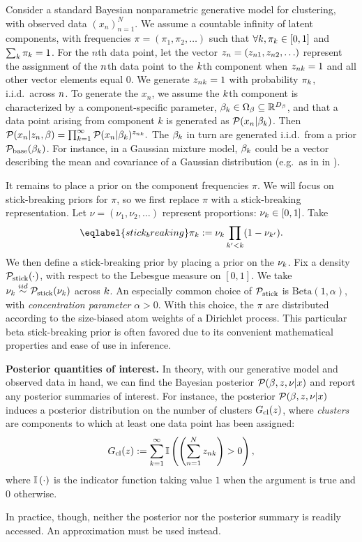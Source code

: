 Consider a standard Bayesian nonparametric generative model for clustering, with observed data $(x_n)_{n=1}^{N}$.
We assume a countable infinity of latent components, with frequencies $\pi = (\pi_1, \pi_2, \ldots)$ such that $\forall k, \pi_k \in [0,1]$ and $\sum_{k} \pi_k = 1$. For the $n$th data point, let the vector $z_n = (z_{n1}, z_{n2}, \ldots)$ represent the assignment of the $n$th data point to the $k$th component when $z_{nk} = 1$ and all other vector elements equal 0. We generate $z_{nk} = 1$ with probability $\pi_k$, i.i.d.\ across $n$. To generate the $x_n$, we assume the $k$th component is characterized by a component-specific parameter, $\beta_k \in
\Omega_{\beta} \subseteq \mathbb{R}^{{D_{\beta}}}$, and that a data point arising from component $k$ is generated as $\mathcal{P}(x_n \vert \beta_k)$. Then
%
$
%
\p(\x_n \vert \z_\n, \beta) =
    \prod_{k=1}^\infty \p(\x_n \vert \beta_\k)^{\z_{\n\k}}.
%
$
The $\beta_k$ in turn are generated i.i.d.\ from a prior $\mathcal{P}_{\mathrm{base}}(\beta_k)$. For instance, in a Gaussian mixture model, $\beta_k$ could be a vector describing the mean and covariance of a Gaussian distribution (e.g.\ as in  in ).

It remains to place a prior on the component frequencies $\pi$. We will focus on stick-breaking priors for $\pi$, so we first replace $\pi$ with a stick-breaking representation. Let $\nu = (\nu_1, \nu_2, \ldots)$ represent proportions: $\nu_{k} \in [0, 1]$. Take
\begin{align}\eqlabel{stick_breaking}
%
\pi_\k := \nuk \prod_{\k' < \k} (1 - \nu_{\k'}).
%
\end{align}
We then define a stick-breaking prior by placing a prior on the $\nu_{k}$.
Fix a density $\mathcal{P}_{\mathrm{stick}}(\cdot)$, with
respect to the Lebesgue measure on $[0,1]$. We take $\nu_{k}\overset{iid}{\sim}\mathcal{P}_{\mathrm{stick}}(\nu_{k})$ across $k$.
An especially common choice of $\mathcal{P}_{\mathrm{stick}}$ is $\mathrm{Beta}(1, \alpha)$, with \emph{concentration parameter}
$\alpha > 0$. With this choice, the 
$\pi$ are distributed according to the size-biased atom weights of a Dirichlet process.
This particular beta stick-breaking prior is often favored due to its convenient mathematical properties and ease of use in inference. 

\noindent \textbf{Posterior quantities of interest.}
In theory, with our generative model and observed data in hand, we can find the Bayesian posterior
$\mathcal{P}(\beta, z, \nu | x)$ and report any posterior summaries of interest. For instance, the posterior $\mathcal{P}(\beta, z, \nu | x)$
induces a posterior distribution on the number of clusters $G_{\text{cl}}(z)$, where \emph{clusters} are components to which at least one
data point has been assigned:
\begin{align*}
  \nclusters(\z) := \sum_{k=1}^{\infty} \ind{ \left(\sum_{n=1}^{N}
  \z_{\n\k}\right) > 0},
\end{align*}
where $\mathbb{I}\left(\cdot\right)$ is the indicator function taking value $1$ when the argument
is true and $0$ otherwise.

In practice, though, neither the posterior nor the posterior summary is readily accessed. An approximation must be used instead.